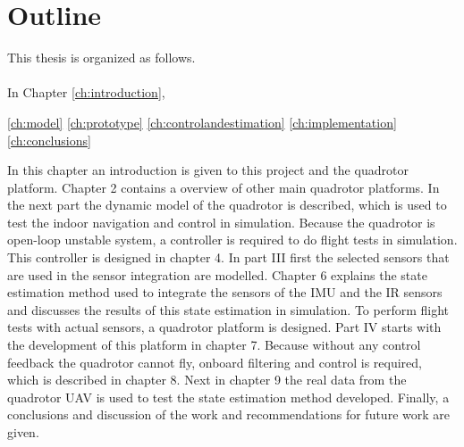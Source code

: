 \section{Outline}
This thesis is organized as follows.\\\\
In Chapter \ref{ch:introduction}, 

\ref{ch:model}
\ref{ch:prototype}
\ref{ch:controlandestimation}
\ref{ch:implementation}
\ref{ch:conclusions}

In this chapter an introduction is given to this project and the quadrotor platform. Chapter 2
contains a overview of other main quadrotor platforms.
In the next part the dynamic model of the quadrotor is described, which is used to test
the indoor navigation and control in simulation. Because the quadrotor is open-loop unstable system,
a controller is required to do flight tests in simulation. This controller is designed in chapter 4.
In part III first the selected sensors that are used in the sensor integration are modelled.
Chapter 6 explains the state estimation method used to integrate the sensors of the IMU and the
IR sensors and discusses the results of this state estimation in simulation.
To perform flight tests with actual sensors, a quadrotor platform is designed. Part IV
starts with the development of this platform in chapter 7. Because without any control feedback
the quadrotor cannot fly, onboard filtering and control is required, which is described in chapter
8. Next in chapter 9 the real data from the quadrotor UAV is used to test the state estimation
method developed.
Finally, a conclusions and discussion of the work and recommendations for future work are
given.
